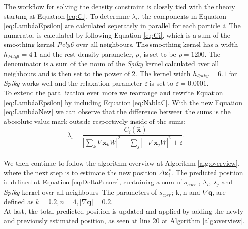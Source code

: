 The workflow for solving the density constraint is closely tied with the theory starting at Equation \ref{eq:Ci}. 
To determine $\lambda_{i}$, the components in Equation \ref{eq:LambdaEpsilon} are calculated seperately in parallel 
for each particle \textit{i}.
The numerator is calculated by following Equation \ref{eq:Ci}, which is a sum of the smoothing kernel \textit{Poly6} over 
all neighbours. The smoothing kernel has a width $h_{Poly6} = 4.1$ and the rest density parameter, $\rho$, is set to be $\rho = 1200$. 
The denominator is a sum of the norm of the \textit{Spiky} kernel calculated over all neighbours 
and is then set to the power of 2. The kernel width $h_{Spiky} = 6.1$ for \textit{Spiky} works well and the 
relaxation parameter $\varepsilon$ is set to $\varepsilon = 0.0001$.
\\
\newline
To extend the parallization even more we rearrange and rewrite Equation \ref{eq:LambdaEpsilon} by including Equation \ref{eq:NablaC}. With the 
new Equation \ref{eq:LambdaNew} we can observe that the difference between the sums is the abosolute value mark 
outside respectively inside of the sums: 
\\
\begin{equation}
\label{eq:LambdaNew}
\lambda_i = \frac{- C_i(\hat{\mathbf{x}}) }{ |\sum\limits_{k} \nabla \mathbf{x}_k W|^{2} + \sum\limits_{j} |-\nabla \mathbf{x}_j W|^2  + \varepsilon}.
\end{equation}
\\
\newline
We then continue to follow the algorithm overview at Algorithm \ref{alg:overview}, where the next step is to estimate the new position $\Delta \mathbf{x}^{*}_{i}$.
The predicted position is defined at Equation \ref{eq:DeltaPscorr}, containing a sum of $s_{corr}$ , $\lambda_{i}$, $\lambda_{j}$ 
and \textit{Spiky} kernel over all neighbours. 
The parameters of $s_{corr}$; k, n and $ \nabla \mathbf{q}$, are defined as $k = 0.2, n = 4, |\nabla \mathbf{q}| = 0.2$. 
\\
At last, the total predicted position is updated and applied by adding the newly and previously estimated position, 
as seen at line 20 at Algorithm \ref{alg:overview}.

